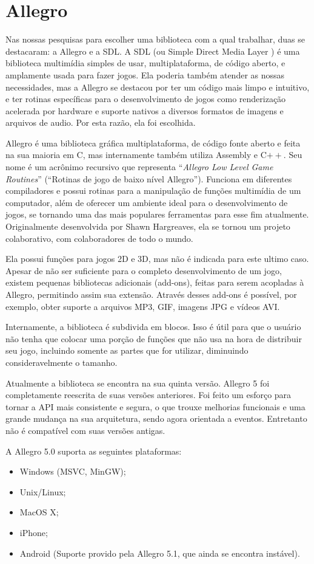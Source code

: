 \documentclass[a4paper,12pt]{report}
\begin{document}
\section{Allegro}
\label{allegro}
%
Nas nossas pesquisas para escolher uma biblioteca com a qual trabalhar, duas se destacaram: a Allegro e a SDL. A SDL (ou Simple Direct Media Layer ) 
é uma biblioteca multimídia simples de usar, multiplataforma, de código aberto, e amplamente usada para fazer  jogos. Ela poderia também atender 
as nossas necessidades, mas a Allegro se destacou por ter um código mais limpo e intuitivo, e ter rotinas específicas para o desenvolvimento de 
jogos como renderização acelerada por hardware e suporte nativos a diversos formatos de imagens e arquivos de audio.  Por esta razão, ela foi escolhida.
\par 
Allegro é uma biblioteca gráfica multiplataforma, de código fonte aberto e feita na sua maioria em C, mas internamente também utiliza Assembly e C$++$. Seu nome é um acrônimo recursivo que representa ``\textit{Allegro Low Level Game Routines}'' (``Rotinas de jogo de baixo nível Allegro'').
Funciona em diferentes compiladores e possui rotinas para a manipulação de funções multimídia de um computador, além de oferecer um ambiente ideal 
para o desenvolvimento de jogos, se tornando uma das mais populares ferramentas para esse fim atualmente. Originalmente desenvolvida por 
Shawn Hargreaves, ela se tornou um projeto colaborativo, com colaboradores de todo o mundo.
\par
Ela possui funções para jogos 2D e 3D, mas não é indicada para este ultimo caso. Apesar de não ser suficiente para o completo desenvolvimento 
de um jogo, existem pequenas bibliotecas adicionais (add-ons), feitas para serem acopladas à Allegro, permitindo assim sua extensão. Através 
desses add-ons é possível, por exemplo, obter suporte a arquivos MP3, GIF, imagens JPG e vídeos AVI.
\par
Internamente, a biblioteca é subdivida em blocos. Isso é útil para que o usuário não tenha que colocar uma porção de funções que não usa na hora 
de distribuir seu jogo, incluindo somente as partes que for utilizar, diminuindo consideravelmente o tamanho.
\par
Atualmente a biblioteca se encontra na sua quinta versão. Allegro 5 foi completamente reescrita de suas versões anteriores. Foi feito um esforço 
para tornar a API mais consistente e segura, o que trouxe melhorias funcionais e uma grande mudança na sua arquitetura, sendo agora orientada 
a eventos. Entretanto não é compatível com suas versões antigas.
\par
A Allegro 5.0 suporta as seguintes plataformas:
\begin{itemize}
 \item Windows (MSVC, MinGW);
 \item Unix/Linux;
 \item MacOS X;
 \item iPhone;
 \item Android (Suporte provido pela Allegro 5.1, que ainda se encontra instável).
\end{itemize}
%
%
\end{document}
